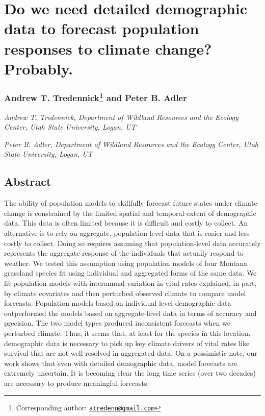 \documentclass[12pt,]{article}
\title{}
\author{}
\date{}
\let\rmarkdownfootnote\footnote%
\def\footnote{\protect\rmarkdownfootnote}
\begin{document}
\maketitle


\section{Do we need detailed demographic data to forecast population
responses to climate change?
Probably.}\label{do-we-need-detailed-demographic-data-to-forecast-population-responses-to-climate-change-probably.}

\subsubsection[Andrew T. Tredennick and Peter B. Adler]{Andrew T.
Tredennick\footnote{Corresponding author:
  \href{mailto:atredenn@gmail.com}{\href{mailto:atredenn@gmail.com}{\nolinkurl{atredenn@gmail.com}}}}
and Peter B.
Adler}\label{andrew-t.-tredennickcorrauth-and-peter-b.-adler}

\emph{Andrew T. Tredennick, Department of Wildland Resources and the
Ecology Center, Utah State University, Logan, UT}

\emph{Peter B. Adler, Department of Wildland Resources and the Ecology
Center, Utah State University, Logan, UT}

\subsection{Abstract}\label{abstract}

The ability of population models to skillfully forecast future states
under climate change is constrained by the limited spatial and temporal
extent of demographic data. This data is often limited because it is
difficult and costly to collect. An alternative is to rely on aggregate,
population-level data that is easier and less costly to collect. Doing
so requires assuming that population-level data accurately represents
the aggregate response of the individuals that actually respond to
weather. We tested this assumption using population models of four
Montana grassland species fit using individual and aggregated forms of
the same data. We fit population models with interannual variation in
vital rates explained, in part, by climate covariates and then perturbed
observed climate to compare model forecasts. Population models based on
individual-level demographic data outperformed the models based on
aggregate-level data in terms of accuracy and precision. The two model
types produced inconsistent forecasts when we perturbed climate. Thus,
it seems that, at least for the species in this location, demographic
data is necessary to pick up key climate drivers of vital rates like
survival that are not well resolved in aggregated data. On a pessimistic
note, our work shows that even with detailed demographic data, model
forecasts are extremely uncertain. It is becoming clear the long time
series (over two decades) are necessary to produce meaningful forecasts.
\end{document}
